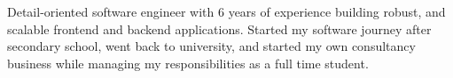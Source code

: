 

\begin{cvparagraph}

Detail-oriented software engineer with 6 years of experience building robust, and scalable frontend and backend applications. Started my software journey after secondary school, went back to university, and started my own consultancy business while managing my responsibilities as a full time student.

\end{cvparagraph}
